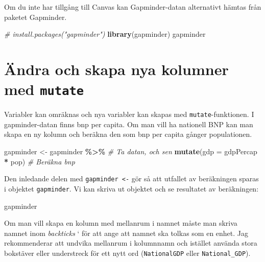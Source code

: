 \documentclass[
]{book}
\newenvironment{Shaded}{\begin{snugshade}}{\end{snugshade}}
\newcommand{\AttributeTok}[1]{\textcolor[rgb]{0.13,0.29,0.53}{#1}}
\newcommand{\CommentTok}[1]{\textcolor[rgb]{0.56,0.35,0.01}{\textit{#1}}}
\newcommand{\FunctionTok}[1]{\textcolor[rgb]{0.13,0.29,0.53}{\textbf{#1}}}
\newcommand{\NormalTok}[1]{#1}
\newcommand{\OtherTok}[1]{\textcolor[rgb]{0.56,0.35,0.01}{#1}}
\newcommand{\SpecialCharTok}[1]{\textcolor[rgb]{0.81,0.36,0.00}{\textbf{#1}}}
\theoremstyle{definition}
\theoremstyle{definition}
\theoremstyle{definition}
\theoremstyle{definition}
\theoremstyle{remark}
\begin{document}
Om du inte har tillgång till Canvas kan Gapminder-datan alternativt hämtas från paketet Gapminder.

\begin{Shaded}
\begin{Highlighting}[]
\CommentTok{\# install.packages("gapminder")}
\FunctionTok{library}\NormalTok{(gapminder)             }
\NormalTok{gapminder                      }
\end{Highlighting}
\end{Shaded}

\section{\texorpdfstring{Ändra och skapa nya kolumner med \texttt{mutate}}{Ändra och skapa nya kolumner med mutate}}\label{uxe4ndra-och-skapa-nya-kolumner-med-mutate}

Variabler kan omräknas och nya variabler kan skapas med \texttt{mutate}-funktionen. I gapminder-datan finns bnp per capita. Om man vill ha nationell BNP kan man skapa en ny kolumn och beräkna den som bnp per capita gånger populationen.

\begin{Shaded}
\begin{Highlighting}[]
\NormalTok{gapminder }\OtherTok{\textless{}{-}}\NormalTok{ gapminder }\SpecialCharTok{\%\textgreater{}\%}             \CommentTok{\# Ta datan, och sen}
  \FunctionTok{mutate}\NormalTok{(}\AttributeTok{gdp =}\NormalTok{ gdpPercap }\SpecialCharTok{*}\NormalTok{ pop)        }\CommentTok{\# Beräkna bnp}
\end{Highlighting}
\end{Shaded}

Den inledande delen med \texttt{gapminder\ \textless{}-} gör så att utfallet av beräkningen sparas i objektet \texttt{gapminder}.
Vi kan skriva ut objektet och se resultatet av beräkningen:

\begin{Shaded}
\begin{Highlighting}[]
\NormalTok{gapminder}
\end{Highlighting}
\end{Shaded}

Om man vill skapa en kolumn med mellanrum i namnet måste man skriva namnet inom \emph{backticks} ` för att ange att namnet ska tolkas som en enhet. Jag rekommenderar att undvika mellanrum i kolumnnamn och istället använda stora bokstäver eller understreck för ett nytt ord (\texttt{NationalGDP} eller \texttt{National\_GDP}).
\end{document}
